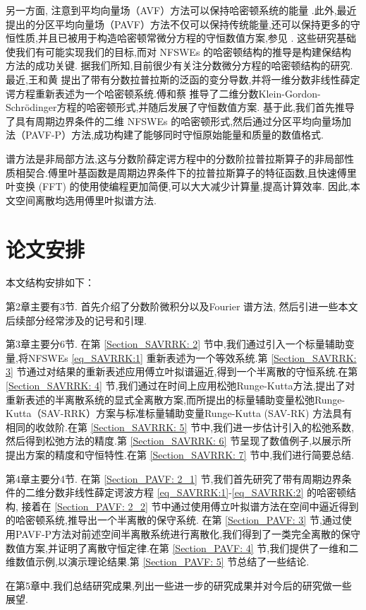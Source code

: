 另一方面,
注意到平均向量场（AVF）方法可以保持哈密顿系统的能量 \cite{buddGeometricIntegrationUsing1999,quispelNewClassEnergypreserving2008}.此外,最近提出的分区平均向量场（PAVF）方法不仅可以保持传统能量,还可以保持更多的守恒性质,并且已被用于构造哈密顿常微分方程的守恒数值方案,参见 \cite{caiPartitionedAveragedVector2018}.
这些研究基础使我们有可能实现我们的目标,而对 NFSWEs 的哈密顿结构的推导是构建保结构方法的成功关键.
据我们所知,目前很少有关注分数微分方程的哈密顿结构的研究.最近,王和黄 \cite{wangStructurepreservingNumericalMethods2018} 提出了带有分数拉普拉斯的泛函的变分导数,并将一维分数非线性薛定谔方程重新表述为一个哈密顿系统.傅和蔡 \cite{fuStructurepreservingAlgorithmsTwodimensional2020} 推导了二维分数Klein-Gordon-Schr{\"o}dinger方程的哈密顿形式,并随后发展了守恒数值方案.
基于此,我们首先推导了具有周期边界条件的二维 NFSWEs 的哈密顿形式,然后通过分区平均向量场加法（PAVF-P）方法,成功构建了能够同时守恒原始能量和质量的数值格式.

谱方法是非局部方法,这与分数阶薛定谔方程中的分数阶拉普拉斯算子的非局部性质相契合.傅里叶基函数是周期边界条件下的拉普拉斯算子的特征函数,且快速傅里叶变换 (FFT) 的使用使编程更加简便,可以大大减少计算量,提高计算效率.
因此,本文空间离散均选用傅里叶拟谱方法.

\section{论文安排}
本文结构安排如下：

第2章主要有3节. 首先介绍了分数阶微积分以及Fourier 谱方法, 
然后引进一些本文后续部分经常涉及的记号和引理.

第3章主要分6节. 在第 \ref{Section_SAVRRK: 2} 节中,我们通过引入一个标量辅助变量,将NFSWEs \eqref{eq_SAVRRK:1} 重新表述为一个等效系统.第 \ref{Section_SAVRRK: 3} 节通过对结果的重新表述应用傅立叶拟谱逼近,得到一个半离散的守恒系统.在第 \ref{Section_SAVRRK: 4} 节,我们通过在时间上应用松弛Runge-Kutta方法,提出了对重新表述的半离散系统的显式全离散方案,而所提出的标量辅助变量松弛Runge-Kutta（SAV-RRK）方案与标准标量辅助变量Runge-Kutta (SAV-RK) 方法具有相同的收敛阶.在第 \ref{Section_SAVRRK: 5} 节中,我们进一步估计引入的松弛系数,然后得到松弛方法的精度.第 \ref{Section_SAVRRK: 6} 节呈现了数值例子,以展示所提出方案的精度和守恒特性.在第 \ref{Section_SAVRRK: 7} 节中,我们进行简要总结.


第4章主要分4节. 在第 \ref{Section_PAVF: 2_1} 节,我们首先研究了带有周期边界条件的二维分数非线性薛定谔波方程 \eqref{eq_SAVRRK:1}-\eqref{eq_SAVRRK:2} 的哈密顿结构, 接着在 \ref{Section_PAVF: 2_2} 节中通过使用傅立叶拟谱方法在空间中逼近得到的哈密顿系统,推导出一个半离散的保守系统.
在第 \ref{Section_PAVF: 3} 节,通过使用PAVF-P方法对前述空间半离散系统进行离散化,我们得到了一类完全离散的保守数值方案,并证明了离散守恒定律.在第 \ref{Section_PAVF: 4} 节,我们提供了一维和二维数值示例,以演示理论结果.第 \ref{Section_PAVF: 5} 节总结了一些结论.

在第5章中.我们总结研究成果,列出一些进一步的研究成果并对今后的研究做一些展望.